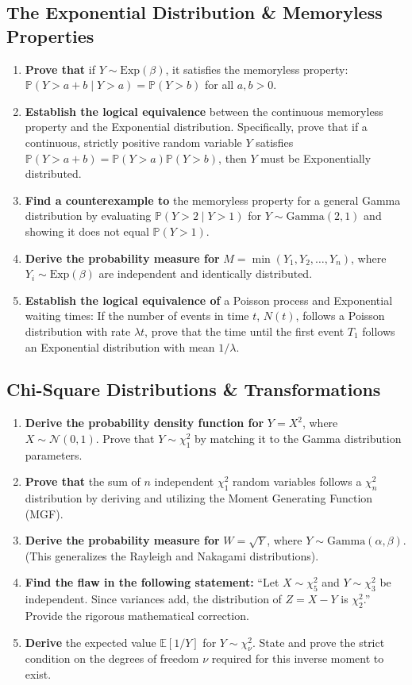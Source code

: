 \documentclass[11pt, a4paper]{article}
\theoremstyle{definition}
\theoremstyle{remark}
\newcommand{\E}{\mathbb{E}}
\newcommand{\Prob}{\mathbb{P}}
\begin{document}
\subsection{The Exponential Distribution \& Memoryless Properties}
\begin{enumerate}[label=\textbf{\arabic*.}, resume]
    \item \textbf{Prove that} if $Y \sim \text{Exp}(\beta)$, it satisfies the memoryless property: $\Prob(Y > a + b \mid Y > a) = \Prob(Y > b)$ for all $a, b > 0$.
    \item \textbf{Establish the logical equivalence} between the continuous memoryless property and the Exponential distribution. Specifically, prove that if a continuous, strictly positive random variable $Y$ satisfies $\Prob(Y > a + b) = \Prob(Y > a)\Prob(Y > b)$, then $Y$ must be Exponentially distributed.
    \item \textbf{Find a counterexample to} the memoryless property for a general Gamma distribution by evaluating $\Prob(Y > 2 \mid Y > 1)$ for $Y \sim \text{Gamma}(2, 1)$ and showing it does not equal $\Prob(Y > 1)$.
    \item \textbf{Derive the probability measure for} $M = \min(Y_1, Y_2, \dots, Y_n)$, where $Y_i \sim \text{Exp}(\beta)$ are independent and identically distributed.
    \item \textbf{Establish the logical equivalence of} a Poisson process and Exponential waiting times: If the number of events in time $t$, $N(t)$, follows a Poisson distribution with rate $\lambda t$, prove that the time until the first event $T_1$ follows an Exponential distribution with mean $1/\lambda$.
\end{enumerate}

\subsection{Chi-Square Distributions \& Transformations}
\begin{enumerate}[label=\textbf{\arabic*.}, resume]
    \item \textbf{Derive the probability density function for} $Y = X^2$, where $X \sim \mathcal{N}(0,1)$. Prove that $Y \sim \chi^2_1$ by matching it to the Gamma distribution parameters.
    \item \textbf{Prove that} the sum of $n$ independent $\chi^2_1$ random variables follows a $\chi^2_n$ distribution by deriving and utilizing the Moment Generating Function (MGF).
    \item \textbf{Derive the probability measure for} $W = \sqrt{Y}$, where $Y \sim \text{Gamma}(\alpha, \beta)$. (This generalizes the Rayleigh and Nakagami distributions).
    \item \textbf{Find the flaw in the following statement:} ``Let $X \sim \chi^2_5$ and $Y \sim \chi^2_3$ be independent. Since variances add, the distribution of $Z = X - Y$ is $\chi^2_2$.'' Provide the rigorous mathematical correction.
    \item \textbf{Derive} the expected value $\E[1/Y]$ for $Y \sim \chi^2_\nu$. State and prove the strict condition on the degrees of freedom $\nu$ required for this inverse moment to exist.
\end{enumerate}
\end{document}
